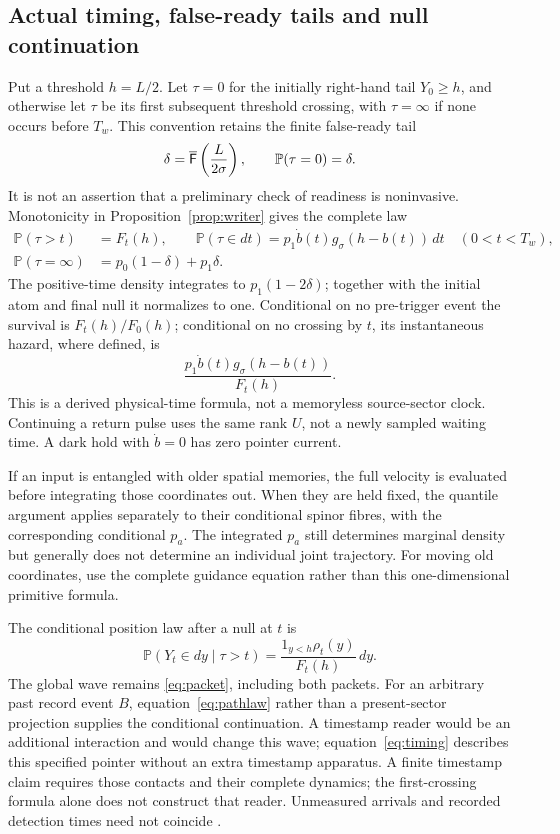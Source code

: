 \documentclass[11pt]{article}
\theoremstyle{definition}\newtheorem{assumption}[theorem]{Constitutive assumption}
\theoremstyle{remark}\newtheorem{remark}[theorem]{Remark}
\newcommand{\Prb}{\mathbb P}\newcommand{\TV}{d_{\rm TV}}
\begin{document}
\subsection{Actual timing, false-ready tails and null continuation}
Put a threshold $h=L/2$. Let $\tau=0$ for the initially right-hand tail $Y_0\ge h$, and otherwise let $\tau$ be its first subsequent threshold crossing, with $\tau=\infty$ if none occurs before $T_w$. This convention retains the finite false-ready tail
\[
 \delta=\Ntail\left(\frac{L}{2\sigma}\right),\qquad \Prb(\tau=0)=\delta.
\]
It is not an assertion that a preliminary check of readiness is noninvasive.
Monotonicity in Proposition~\ref{prop:writer} gives the complete law
\begin{align}\label{eq:timing}
 \Prb(\tau>t)&=F_t(h),\qquad
 \Prb(\tau\in dt)=p_1\dot b(t)g_\sigma(h-b(t))\,dt\quad(0<t<T_w),\\
 \Prb(\tau=\infty)&=p_0(1-\delta)+p_1\delta.\nonumber
\end{align}
The positive-time density integrates to $p_1(1-2\delta)$; together with the initial atom and final null it normalizes to one. Conditional on no pre-trigger event the survival is $F_t(h)/F_0(h)$; conditional on no crossing by $t$, its instantaneous hazard, where defined, is
\begin{equation}\label{eq:hazard}
 \frac{p_1\dot b(t)g_\sigma(h-b(t))}{F_t(h)}.
\end{equation}
This is a derived physical-time formula, not a memoryless source-sector clock. Continuing a return pulse uses the same rank $U$, not a newly sampled waiting time. A dark hold with $\dot b=0$ has zero pointer current.

If an input is entangled with older spatial memories, the full velocity is evaluated before integrating those coordinates out. When they are held fixed, the quantile argument applies separately to their conditional spinor fibres, with the corresponding conditional $p_a$. The integrated $p_a$ still determines marginal density but generally does not determine an individual joint trajectory. For moving old coordinates, use the complete guidance equation rather than this one-dimensional primitive formula.

The conditional position law after a null at $t$ is
\[
 \Prb(Y_t\in dy\mid\tau>t)=\frac{1_{y<h}\rho_t(y)}{F_t(h)}\,dy.
\]
The global wave remains \eqref{eq:packet}, including both packets. For an arbitrary past record event $B$, equation~\eqref{eq:pathlaw} rather than a present-sector projection supplies the conditional continuation. A timestamp reader would be an additional interaction and would change this wave; equation~\eqref{eq:timing} describes this specified pointer without an extra timestamp apparatus. A finite timestamp claim requires those contacts and their complete dynamics; the first-crossing formula alone does not construct that reader. Unmeasured arrivals and recorded detection times need not coincide \cite{Arrival}.
\end{document}
